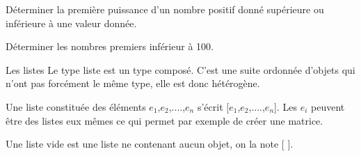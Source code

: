 \begin{ExD}

Déterminer la première puissance d’un nombre positif donné supérieure ou inférieure à une valeur donnée.
\end{ExD}



\begin{ExD}

Déterminer les nombres premiers inférieur à 100. 
\end{ExD}


\newpage

\begin{titre}

\end{titre}


\begin{DefT}{Les listes}
Le type liste est un type composé. C'est une suite ordonnée d'objets qui n'ont pas forcément le même type, elle est donc hétérogène. 

Une liste constituée des éléments $e_1$,$e_2$,....,$e_n$  s'écrit [$e_1$,$e_2$,....,$e_n$]. Les $e_i$ peuvent  être des listes eux mêmes ce qui permet par exemple de créer une matrice.

Une liste vide est une liste ne contenant aucun objet, on la note [ ].
\end{DefT}

